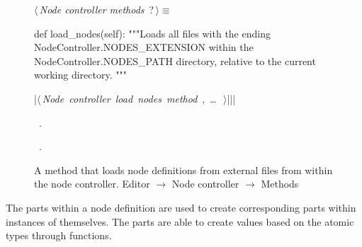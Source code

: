 \documentclass[%
    a4paper,    %
    justified,  %
    nobib,      %
    openany     %
]{tufte-book}
\begin{document}
\begin{figure}
\begin{flushleft} \small
\begin{minipage}{\linewidth}\label{scrap108}\raggedright\small
{} $\langle\,${\itshape Node controller methods}\nobreak\ {\footnotesize {?}}$\,\rangle\equiv$
\vspace{-1ex}
\begin{pythoncode}
def load_nodes(self):
    """Loads all files with the ending NodeController.NODES_EXTENSION
    within the NodeController.NODES_PATH directory, relative to the current
    working directory.
    """

    |\hbox{$\langle\,${\itshape Node controller load nodes method}\nobreak\ {\footnotesize {}, \ldots\ }$\,\rangle$}||\NWsep|
\end{pythoncode}
\vspace{1.5ex}
\footnotesize
\begin{list}{}{\setlength{\itemsep}{-\parsep}\setlength{\itemindent}{-\leftmargin}}
\item \NWtxtMacroDefBy\ .
\item \NWtxtMacroRefIn\ .

\item{}
\end{list}
\end{minipage}\vspace{4ex}
\end{flushleft}
\caption{A method that loads node definitions from external files from within
  the node controller.
  \newline{}\newline{}Editor $\rightarrow$ Node controller $\rightarrow$
  Methods}
\label{editor:lst:node-controller:methods:load-nodes}
\end{figure}

 The parts within a node
definition are used to create corresponding parts within instances of
themselves. The parts are able to create values based on the atomic types
through functions.
\end{document}
